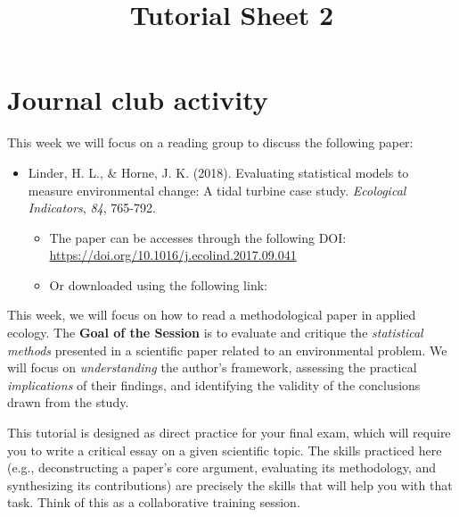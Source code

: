 \documentclass[
  letterpaper,
  DIV=11,
  numbers=noendperiod]{scrartcl}
\title{Tutorial Sheet 2}
\author{}
\date{}
\makeatletter
\providecommand{\tightlist}{%
  \setlength{\itemsep}{0pt}\setlength{\parskip}{0pt}}\usepackage{longtable,booktabs,array}
\renewcommand{\maketitle}{\bgroup\setlength{\parindent}{0pt}
\begin{flushleft}
  {\color{uniblue}\sffamily\huge\textbf{\@title}} \vspace{0.3cm} \newline
  {\Large {\@subtitle}} \newline
  \@author
\end{flushleft}\egroup
}
\makeatother
\begin{document}
\maketitle

\pagestyle{mystyle}


\section{Journal club activity}\label{journal-club-activity}

This week we will focus on a reading group to discuss the following
paper:

\begin{itemize}
\tightlist
\item
  Linder, H. L., \& Horne, J. K. (2018). Evaluating statistical models
  to measure environmental change: A tidal turbine case study.
  \emph{Ecological Indicators}, \emph{84}, 765-792.

  \begin{itemize}
  \tightlist
  \item
    The paper can be accesses through the following DOI:
    \url{https://doi.org/10.1016/j.ecolind.2017.09.041}
  \item
    Or downloaded using the following link:
  \end{itemize}
\end{itemize}

This week, we will focus on how to read a methodological paper in
applied ecology. The \textbf{Goal of the Session} is to evaluate and
critique the \emph{statistical methods} presented in a scientific paper
related to an environmental problem. We will focus on
\emph{understanding} the author's framework, assessing the practical
\emph{implications} of their findings, and identifying the validity of
the conclusions drawn from the study.

\begin{tcolorbox}[enhanced jigsaw, colbacktitle=quarto-callout-note-color!10!white, colframe=quarto-callout-note-color-frame, left=2mm, rightrule=.15mm, breakable, bottomrule=.15mm, toptitle=1mm, arc=.35mm, toprule=.15mm, coltitle=black, colback=white, opacityback=0, bottomtitle=1mm, titlerule=0mm, title=\textcolor{quarto-callout-note-color}{\faInfo}\hspace{0.5em}{Note}, opacitybacktitle=0.6, leftrule=.75mm]

This tutorial is designed as direct practice for your final exam, which
will require you to write a critical essay on a given scientific topic.
The skills practiced here (e.g., deconstructing a paper's core argument,
evaluating its methodology, and synthesizing its contributions) are
precisely the skills that will help you with that task. Think of this as
a collaborative training session.

\end{tcolorbox}
\end{document}
